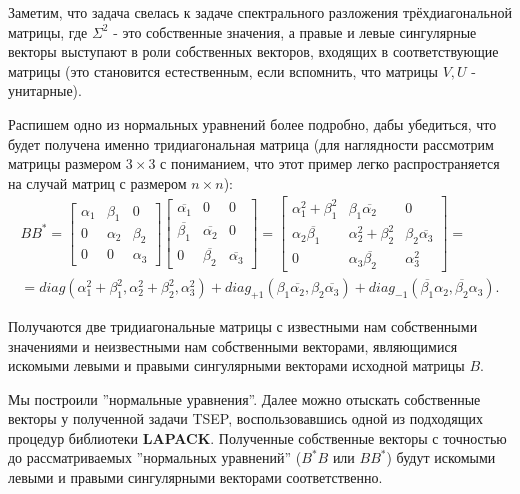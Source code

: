 Заметим, что задача свелась к задаче спектрального разложения трёхдиагональной матрицы, где $\Sigma^2$ - это собственные значения, а правые и левые сингулярные векторы выступают в роли собственных векторов, входящих в соответствующие матрицы (это становится естественным, если вспомнить, что матрицы \(V,U\) - унитарные). 

Распишем одно из нормальных уравнений более подробно, дабы убедиться, что будет получена именно тридиагональная матрица (для наглядности рассмотрим матрицы размером $3\times 3$ с пониманием, что этот пример легко распространяется на случай матриц с размером $n\times n$):
\begin{equation*}
    \begin{split}
        BB^*=\begin{bmatrix}
            \alpha_1 & \beta_1 & 0\\
            0 & \alpha_2 & \beta_2 \\
            0 & 0 & \alpha_3  
        \end{bmatrix}\begin{bmatrix}
            \overline{\alpha_1} & 0 & 0\\
            \overline{\beta_1} & \overline{\alpha_2} & 0 \\
            0 & \overline{\beta_2} & \overline{\alpha_3}  
        \end{bmatrix} =
        \begin{bmatrix}
            \alpha_1^2+\beta^2_1 & \beta_1 \overline{\alpha_2} & 0 \\
            \alpha_2 \overline{\beta_1} & \alpha_2^2+\beta_2^2 & \beta_2 \overline{\alpha_3} \\
            0 & \alpha_3 \overline{\beta_2} & \alpha_3^2
        \end{bmatrix} =\\[6pt]= diag(\alpha_1^2+\beta^2_1, \alpha_2^2+\beta^2_2,\alpha_3^2)+diag_{+1}(\beta_1 \overline{\alpha_2},\beta_2 \overline{\alpha_3})+diag_{-1}(\overline{\beta_1} \alpha_2,\overline{\beta_2} \alpha_3).
    \end{split}
\end{equation*}

Получаются две тридиагональные матрицы с известными нам собственными значениями и неизвестными нам собственными векторами, являющимися искомыми левыми и правыми сингулярными векторами исходной матрицы $B$.

Мы построили ''нормальные уравнения''. Далее можно отыскать собственные векторы у полученной задачи TSEP, воспользовавшись одной из подходящих процедур библиотеки \textbf{LAPACK}. Полученные собственные векторы с точностью до рассматриваемых ''нормальных уравнений'' (\(B^*B\) или \(BB^*\)) будут искомыми левыми и правыми сингулярными векторами соответственно.

